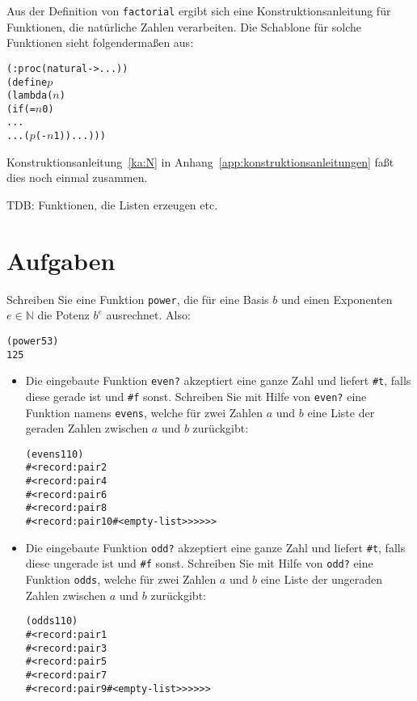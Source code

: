 Aus der Definition von \texttt{factorial} ergibt sich eine
Konstruktionsanleitung für Funktionen, die natürliche Zahlen
verarbeiten.  Die Schablone für solche Funktionen sieht folgendermaßen aus:
%
\begin{alltt}
(: proc (natural -> ...))
(define \(p\)
  (lambda (\(n\))
    (if (= \(n\) 0)
        ...
        ... (\(p\) (- \(n\) 1)) ...)))
\end{alltt}
\label{sec:ka-recursion-numbers}
%
Konstruktionsanleitung~\ref{ka:N} in
Anhang~\ref{app:konstruktionsanleitungen} faßt dies noch einmal
zusammen.

TDB: Funktionen, die Listen erzeugen etc.

\section*{Aufgaben}

\begin{aufgabe}\label{aufg:power}
  Schreiben Sie eine Funktion \texttt{power}, die für eine Basis $b$ und
  einen Exponenten $e\in\mathbb{N}$ die Potenz $b^e$ ausrechnet.  Also:
\begin{alltt}
(power 5 3)
\evalsto{} 125
\end{alltt}
  \end{aufgabe}

\begin{aufgabe}\label{ex:evensodds}
  \begin{itemize}
  \item
    Die eingebaute Funktion \texttt{even?}
    akzeptiert eine ganze Zahl und liefert \verb|#t|, falls diese
    gerade ist und \verb|#f| sonst.
    Schreiben Sie mit Hilfe von \texttt{even?}
    eine Funktion namens \texttt{evens}, welche für zwei
    Zahlen $a$ und $b$ eine Liste der geraden Zahlen zwischen $a$ und
    $b$ zurückgibt:
\begin{alltt}
(evens 1 10)
\evalsto{} #<record:pair 2
     #<record:pair 4
       #<record:pair 6
         #<record:pair 8
           #<record:pair 10 #<empty-list>>>>>>
\end{alltt}
  \item
    Die eingebaute Funktion \texttt{odd?}
    akzeptiert eine ganze Zahl und liefert \verb|#t|, falls diese
    ungerade ist und \verb|#f| sonst.
    Schreiben Sie mit Hilfe von \texttt{odd?} eine Funktion \texttt{odds}, welche für zwei
    Zahlen $a$ und $b$ eine Liste der ungeraden Zahlen zwischen $a$ und $b$
    zurückgibt:
\begin{alltt}
(odds 1 10)
\evalsto{} #<record:pair 1
     #<record:pair 3
       #<record:pair 5
         #<record:pair 7
           #<record:pair 9 #<empty-list>>>>>>
\end{alltt}
  \end{itemize}
\end{aufgabe}

